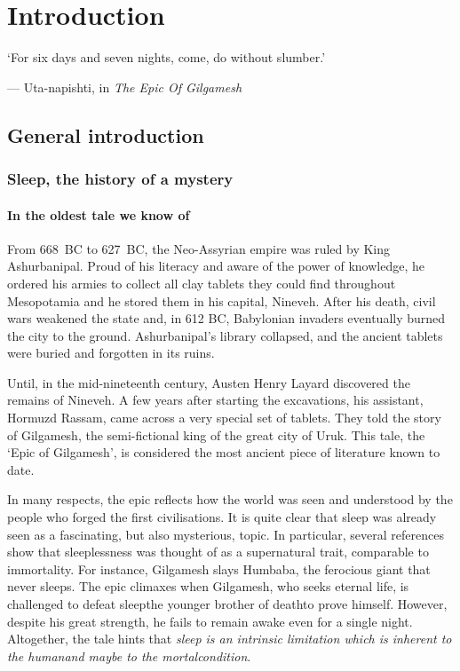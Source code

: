 \edef\figdir{\currfiledir/fig}

\chapter{Introduction} \label{intro}
	
\epigraph{
	`For six days and seven nights, come, do without
slumber.'}{--- Uta-napishti, in \emph{The Epic Of Gilgamesh}\cite[tablet~XI~209]{george_epic_2002}}
\section{General introduction}
\subsection{Sleep, the history of a mystery}
\subsubsection{In the oldest tale we know of}
From 668~BC to 627~BC, the Neo-Assyrian empire was ruled by King Ashurbanipal.
Proud of his literacy and aware of the power of knowledge, he ordered his armies to collect all clay tablets they could find
throughout Mesopotamia and he stored them in his capital, Nineveh. 
After his death, civil wars weakened the state and, in 612 BC, Babylonian invaders eventually burned the city to the ground.
Ashurbanipal's library collapsed, and the ancient tablets were buried and forgotten in its ruins\cite{menant_bibliotheque_1880,polastron_books_2007}.


Until, in the mid-nineteenth century, Austen Henry Layard discovered the remains of Nineveh\cite{layard_discoveries_1853}.
A few years after starting the excavations, his assistant, Hormuzd Rassam, came across a very special set of tablets.
They told the story of Gilgamesh, the semi-fictional king of the great city of Uruk\cite{menant_bibliotheque_1880}.
This tale, the `Epic of Gilgamesh', is considered the most ancient piece of literature known to date\cite{tigay_evolution_2002}.

In many respects, the epic reflects how the world was seen and understood by the people who forged the first civilisations.
It is quite clear that sleep was already seen as a fascinating, but also mysterious, topic. 
In particular, several references show that sleeplessness was thought of as a supernatural trait, comparable to immortality.
For instance, Gilgamesh slays Humbaba, the ferocious giant that never sleeps\cite[I~239]{george_epic_2002}.
The epic climaxes when Gilgamesh, who seeks eternal life, is challenged to defeat sleep\emd{}the younger brother of death\emd{}to prove himself.
However, despite his great strength, he fails to remain awake even for a single night\cite[XI~209]{george_epic_2002}. 
Altogether, the tale hints that \emph{sleep is an intrinsic limitation which is inherent to the human\emd{}and maybe to the mortal\emd{}condition}.

